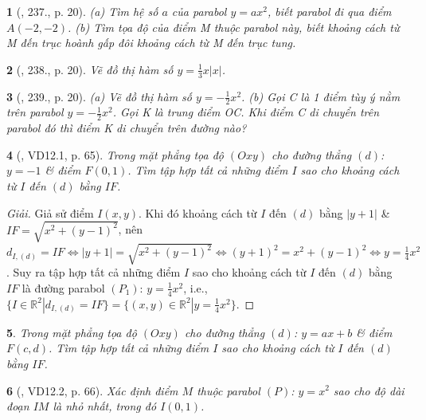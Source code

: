 \documentclass{article}
\newtheorem{baitoan}{}
\begin{document}
\begin{baitoan}[\cite{Binh_Toan_9_tap_2}, 237., p. 20]
	(a) Tìm hệ số $a$ của parabol $y = ax^2$, biết parabol đi qua điểm $A(-2,-2)$. (b) Tìm tọa độ của điểm M thuộc parabol này, biết khoảng cách từ M đến trục hoành gấp đôi khoảng cách từ M đến trục tung.
\end{baitoan}

\begin{baitoan}[\cite{Binh_Toan_9_tap_2}, 238., p. 20]
	Vẽ đồ thị hàm số $y = \frac{1}{3}x|x|$.
\end{baitoan}

\begin{baitoan}[\cite{Binh_Toan_9_tap_2}, 239., p. 20]
	(a) Vẽ đồ thị hàm số $y = -\frac{1}{2}x^2$. (b) Gọi C là 1 điểm tùy ý nằm trên parabol $y = -\frac{1}{2}x^2$. Gọi K là trung điểm OC. Khi điểm C di chuyển trên parabol đó thì điểm K di chuyển trên đường nào?
\end{baitoan}

\begin{baitoan}[\cite{TLCT_THCS_Toan_9_dai_so}, VD12.1, p. 65]
	Trong mặt phẳng tọa độ $(Oxy)$ cho đường thẳng $(d)$: $y = -1$ \& điểm $F(0,1)$. Tìm tập hợp tất cả những điểm $I$ sao cho khoảng cách từ $I$ đến $(d)$ bằng $IF$.
\end{baitoan}

\begin{proof}[Giải]
	Giả sử điểm $I(x,y)$. Khi đó khoảng cách từ $I$ đến $(d)$ bằng $|y + 1|$ \& $IF = \sqrt{x^2 + (y - 1)^2}$, nên $d_{I,(d)} = IF\Leftrightarrow|y + 1| = \sqrt{x^2 + (y - 1)^2}\Leftrightarrow(y + 1)^2 = x^2 + (y - 1)^2\Leftrightarrow y = \frac{1}{4}x^2$. Suy ra tập hợp tất cả những điểm $I$ sao cho khoảng cách từ $I$ đến $(d)$ bằng $IF$ là đường parabol $(P_1)$: $y = \frac{1}{4}x^2$, i.e., $\{I\in\mathbb{R}^2|d_{I,(d)} = IF\} = \{(x,y)\in\mathbb{R}^2|y = \frac{1}{4}x^2\}$.
\end{proof}

\begin{baitoan}
	Trong mặt phẳng tọa độ $(Oxy)$ cho đường thẳng $(d)$: $y = ax + b$ \& điểm $F(c,d)$. Tìm tập hợp tất cả những điểm $I$ sao cho khoảng cách từ $I$ đến $(d)$ bằng $IF$.
\end{baitoan}

\begin{baitoan}[\cite{TLCT_THCS_Toan_9_dai_so}, VD12.2, p. 66]
	Xác định điểm $M$ thuộc parabol $(P)$: $y = x^2$ sao cho độ dài đoạn $IM$ là nhỏ nhất, trong đó $I(0,1)$.
\end{baitoan}
\end{document}
